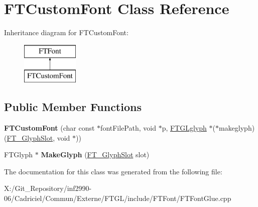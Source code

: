 \hypertarget{class_f_t_custom_font}{\section{F\-T\-Custom\-Font Class Reference}
\label{class_f_t_custom_font}
}
Inheritance diagram for F\-T\-Custom\-Font\-:\begin{figure}[H]
\begin{center}
\leavevmode
\includegraphics[height=2.000000cm]{class_f_t_custom_font}
\end{center}
\end{figure}
\subsection*{Public Member Functions}
\begin{DoxyCompactItemize}
\item 
\hypertarget{class_f_t_custom_font_a752e3adba12661605536402b55381aa8}{{\bfseries F\-T\-Custom\-Font} (char const $\ast$font\-File\-Path, void $\ast$p, \hyperlink{struct___f_t_g_lglyph}{F\-T\-G\-Lglyph} $\ast$($\ast$makeglyph)(\hyperlink{struct_f_t___glyph_slot_rec__}{F\-T\-\_\-\-Glyph\-Slot}, void $\ast$))}\label{class_f_t_custom_font_a752e3adba12661605536402b55381aa8}

\item 
\hypertarget{class_f_t_custom_font_a14863f6c098d220681087ff85f004dff}{F\-T\-Glyph $\ast$ {\bfseries Make\-Glyph} (\hyperlink{struct_f_t___glyph_slot_rec__}{F\-T\-\_\-\-Glyph\-Slot} slot)}\label{class_f_t_custom_font_a14863f6c098d220681087ff85f004dff}

\end{DoxyCompactItemize}


The documentation for this class was generated from the following file\-:\begin{DoxyCompactItemize}
\item 
X\-:/\-Git\-\_\-\-Repository/inf2990-\/06/\-Cadriciel/\-Commun/\-Externe/\-F\-T\-G\-L/include/\-F\-T\-Font/F\-T\-Font\-Glue.\-cpp\end{DoxyCompactItemize}
